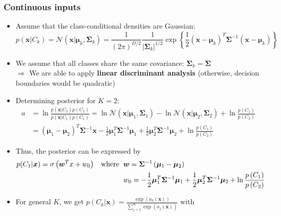 \subsubsection{Continuous inputs}
\begin{itemize}
	\item Assume that the class-conditional  densities are Gaussian:
	$$p\left(\bm{x}|C_k\right) = \mathcal{N}\left(\bm{x}|\bm{\mu}_k,\bm{\Sigma}_k\right) = \frac{1}{\left(2\pi\right)^{D/2}}\frac{1}{|\bm{\Sigma}_k|^{1/2}}\exp\left\{\frac{1}{2}\left(\bm{x}-\bm{\mu}_k\right)^T\bm{\Sigma}^{-1}\left(\bm{x}-\bm{\mu}_k\right)\right\}$$
	\item We assume that all classes share the same covariance: $\bm{\Sigma}_k = \bm{\Sigma}$\\$\Rightarrow$ We are able to apply \textbf{linear discriminant analysis} (otherwise, decision boundaries would be quadratic)
	\item Determining posterior for $K=2$:
	\begin{equation*}
		\begin{split}
			a & = \ln \frac{p\left(\bm{x}|C_2\right)p\left(C_2\right)}{p\left(\bm{x}|C_1\right)p\left(C_1\right)} = \ln \mathcal{N}\left(\bm{x}|\bm{\mu}_1,\bm{\Sigma}_1\right) - \ln \mathcal{N}\left(\bm{x}|\bm{\mu}_2,\bm{\Sigma}_2\right) + \ln \frac{p\left(C_1\right)}{p\left(C_2\right)}\\
			& = \left(\bm{\mu}_1 - \bm{\mu}_2\right)^T\bm{\Sigma}^{-1}\bm{x} - \frac{1}{2}\bm{\mu}_1^T\bm{\Sigma}^{-1}\bm{\mu}_1 + \frac{1}{2}\bm{\mu}_2^T\bm{\Sigma}^{-1}\bm{\mu}_2 + \ln \frac{p\left(C_1\right)}{p\left(C_2\right)}
		\end{split}
	\end{equation*}
	\item Thus, the posterior can be expressed by
	\begin{equation*}
		\begin{split}
			p(C_1|\bm{x})=\sigma\left(\bm{w}^Tx+w_0\right) \text{\hspace{3mm}where\hspace{2mm}} & \bm{w} = \bm{\Sigma}^{-1}\left(\bm{\mu}_1 - \bm{\mu}_2\right)\\
			& w_0 = -\frac{1}{2}\bm{\mu}_1^T\bm{\Sigma}^{-1}\bm{\mu}_1 + \frac{1}{2}\bm{\mu}_2^T\bm{\Sigma}^{-1}\bm{\mu}_2 + \ln \frac{p\left(C_1\right)}{p\left(C_2\right)}
		\end{split}
	\end{equation*} 
	\item For general $K$, we get $p\left(C_k|\bm{x}\right) = \frac{\exp\left(a_k\left(\bm{x}\right)\right)}{\sum_{j=1}^{K}\exp\left(a_j\left(\bm{x}\right)\right)}$ with 

\end{itemize}
